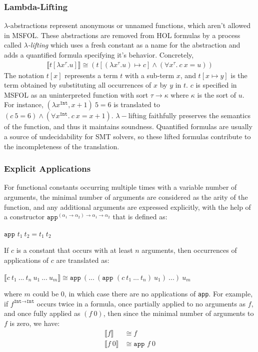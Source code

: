 \documentclass{article}
\begin{document}
	\subsubsection{Lambda-Lifting}
	$\lambda$-abstractions represent 
	anonymous or unnamed functions, 
	which aren't allowed in MSFOL.
	These abstractions are removed
	from HOL formulas by a process 
	called \textit{$\lambda$-lifting}
	which uses a fresh constant as a
	name for the abstraction and adds 
	a quantified formula specifying 
	it's behavior. Concretely,
	\begin{align*}
	\llbracket t[\lambda x^{\tau}.u]
	\rrbracket \cong 
	(t[(\lambda x^{\tau}.u) \mapsto c]
	\land (\forall x^{\tau}.\ c\ x = u))
	\end{align*}
	The notation $t[x]$ represents a 
	term $t$ with a sub-term $x$, 
	and $t[x \mapsto y]$ is the 
	term obtained by substituting all 
	occurrences of $x$ by $y$ in $t$.
	$c$ is specified in MSFOL as an 
	uninterpreted function with sort 
	$\tau \to \kappa$ where $\kappa$ 
	is the sort of $u$. For instance, 
	$(\lambda x^{\texttt{Int}}, x + 1)\ 
	5 = 6$
	is translated to $(c\ 5 = 6) \land
	(\forall x^{\texttt{Int}}.\ 
	c\ x = x + 1)$. $\lambda-$lifting
	faithfully preserves the 
	semantics of the function, and 
	thus it maintains soundness. 
	Quantified formulas are usually a 
	source of undecidability for SMT 
	solvers, so these lifted formulas 
	contribute to the incompleteness
	of the translation.
	
	\subsubsection{Explicit Applications}
	For functional constants 
	occurring multiple times with 
	a variable number 
	of arguments, the minimal 
	number of arguments are 
	considered as the arity of the 
	function, and any additional 
	arguments are expressed 
	explicitly, with the help of a 
	constructor 
	$\texttt{app}^{(\alpha_1 \to 
		\alpha_2) \to \alpha_1 \to 
		\alpha_2}$ that is defined as:
	\begin{center}
		$\texttt{app }t_1\ t_2 = 
		t_1\ t_2$
	\end{center}
	If $c$ is a constant that 
	occurs with at least $n$
	arguments, then 
	occurrences of applications 
	of $c$ are translated as:
	\begin{center}
		$\llbracket c\ t_1\ ...\ t_n
		\ u_1\ ...\ u_m \rrbracket
		\cong \texttt{app}\ (...\ 
		(\texttt{app }(c\ t_1\ 
		...\ t_n)\ u_1)	\ ...)\ u_m$
	\end{center}
	where $m$ could be $0$, in which 
	case there are no applications 
	of \texttt{app}. For example, if 
	$f^{\texttt{Int} \to \texttt{Int}}$ 
	occurs twice in a formula, once 
	partially applied to no arguments 
	as $f$, and once fully applied as 
	$(f\ 0)$, then since the minimal 
	number of arguments to $f$ is 
	zero, we have:
	\begin{align*}
	\llbracket f \rrbracket &\cong
	f\\
	\llbracket f\ 0 \rrbracket &\cong
	\texttt{app } f\ 0
	\end{align*}
	
\end{document}
